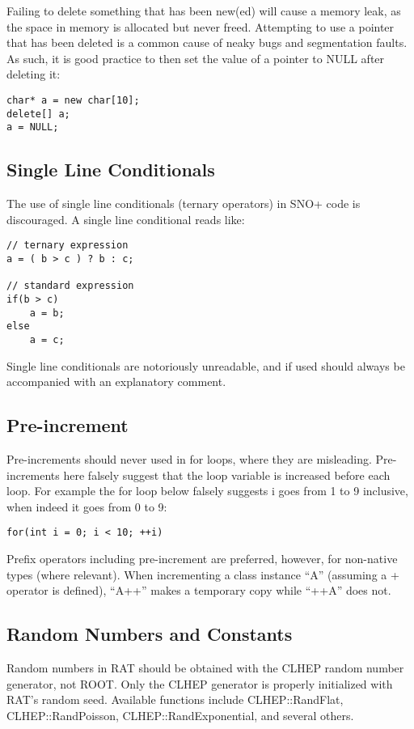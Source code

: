 \documentclass[11pt]{article}
\begin{document}
Failing to delete something that has been new(ed) will cause a memory leak, as the space in memory is allocated but never freed. Attempting to use a pointer that has been deleted is a common cause of neaky bugs and segmentation faults. As such, it is good practice to then set the value of a pointer to NULL after deleting it:
\begin{verbatim}
char* a = new char[10];
delete[] a;
a = NULL;
\end{verbatim}

\subsection{Single Line Conditionals}
The use of single line conditionals (ternary operators) in SNO+ code is discouraged. A single line conditional reads like:
\begin{verbatim}
// ternary expression
a = ( b > c ) ? b : c;

// standard expression
if(b > c)
    a = b;
else
    a = c;
\end{verbatim}
Single line conditionals are notoriously unreadable, and if used should always be accompanied with an explanatory comment.

\subsection{Pre-increment}
Pre-increments should never used in for loops, where they are misleading. Pre-increments here falsely suggest that the loop variable is increased before each loop. For example the for loop below falsely suggests i goes from 1 to 9 inclusive, when indeed it goes from 0 to 9:
\begin{verbatim}
for(int i = 0; i < 10; ++i)
\end{verbatim}

Prefix operators including pre-increment are preferred, however, for non-native types (where relevant). When incrementing a class instance ``A'' (assuming a + operator is defined), ``A++'' makes a temporary copy while ``++A'' does not.

\subsection{Random Numbers and Constants}
Random numbers in RAT should be obtained with the CLHEP random number generator, not ROOT. Only the CLHEP generator is properly initialized with RAT's random seed. Available functions include CLHEP::RandFlat, CLHEP::RandPoisson, CLHEP::RandExponential, and several others.
\end{document}
